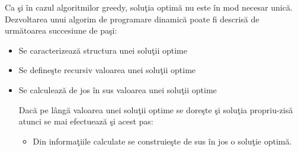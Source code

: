 \documentclass{article}
\begin{document}
Ca şi în cazul algoritmilor greedy, soluţia optimă nu este în mod necesar unică. Dezvoltarea unui algorim de programare dinamică poate fi descrisă de următoarea succesiune de paşi:

\begin{itemize}
	\item Se caracterizează structura unei soluţii optime
	\item Se defineşte recursiv valoarea unei soluţii optime
	\item Se calculează de jos în sus valoarea unei soluţii optime

	Dacă pe lângă valoarea unei soluţii optime se doreşte şi soluţia propriu-zisă atunci se mai efectuează şi acest pas:
	\begin{itemize}
		\item[\textbullet] Din informaţiile calculate se construieşte de sus în jos o soluţie optimă.
	\end{itemize}
\end{itemize}
\end{document}
